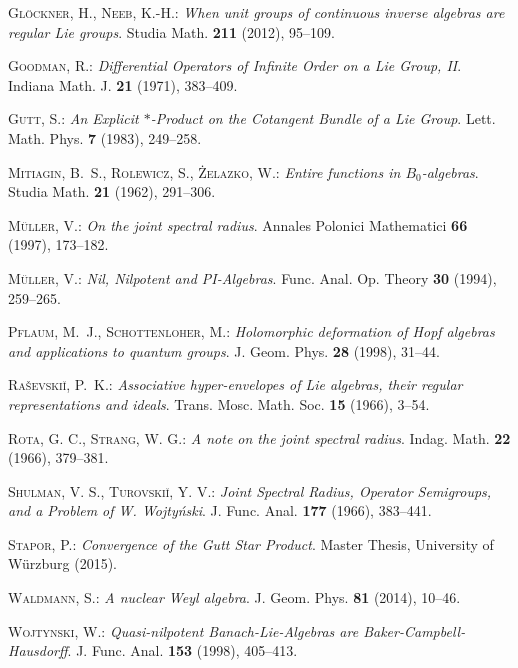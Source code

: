 \documentclass[
11pt,                          %
english                        %
]{article}
\begin{document}
\begin{thebibliography}{1}
\textsc{Gl{\"o}ckner, H., Neeb, K.-H.: }\newblock \emph{When unit groups of
  continuous inverse algebras are regular Lie groups}.
\newblock Studia Math.  \textbf{211} (2012), 95--109.

\textsc{Goodman, R.: }\newblock \emph{Differential Operators of Infinite Order
  on a Lie Group, II}.
\newblock Indiana Math. J.  \textbf{21} (1971), 383--409.

\textsc{Gutt, S.: }\newblock \emph{An Explicit $*$-Product on the Cotangent
  Bundle of a Lie Group}.
\newblock Lett. Math. Phys.  \textbf{7} (1983), 249--258.

\textsc{Mitiagin, B.~S., Rolewicz, S., {\.{Z}}elazko, W.: }\newblock
  \emph{Entire functions in $B_0$-algebras}.
\newblock Studia Math.  \textbf{21} (1962), 291--306.

\textsc{M{\"u}ller, V.: }\newblock \emph{On the joint spectral radius}.
\newblock Annales Polonici Mathematici \textbf{66} (1997), 173--182.

\textsc{M{\"u}ller, V.: }\newblock \emph{Nil, Nilpotent and PI-Algebras}.
\newblock Func. Anal. Op. Theory  \textbf{30} (1994), 259--265.

\textsc{Pflaum, M.~J., Schottenloher, M.: }\newblock \emph{Holomorphic
  deformation of Hopf algebras and applications to quantum groups}.
\newblock J. Geom. Phys.  \textbf{28} (1998), 31--44.

\textsc{Ra{\v{s}}evski{\u{i}}, P.~K.: }\newblock \emph{Associative
  hyper-envelopes of Lie algebras, their regular representations and ideals}.
\newblock Trans. Mosc. Math. Soc.  \textbf{15} (1966), 3--54.

\textsc{Rota, G. C., Strang, W. G.: }\newblock \emph{A note on the joint spectral 
  radius}.
\newblock Indag. Math. \textbf{22} (1966), 379--381.

\textsc{Shulman, V. S., Turovski\u i, Y. V.: }\newblock \emph{Joint Spectral 
  Radius, Operator Semigroups, and a Problem of W. Wojty\'nski}.
\newblock J. Func. Anal. \textbf{177} (1966), 383--441.

\textsc{Stapor, P.: }\newblock \emph{Convergence 
  of the Gutt Star Product}.
\newblock Master Thesis, University of W\"urzburg (2015).

\textsc{Waldmann, S.: }\newblock \emph{A nuclear Weyl algebra}.
\newblock J. Geom. Phys.  \textbf{81} (2014), 10--46.

\textsc{Wojtynski, W.: }\newblock \emph{Quasi-nilpotent 
{B}anach-{L}ie-Algebras are {B}aker-{C}ampbell-{H}ausdorff}.
\newblock J. Func. Anal.  \textbf{153} (1998), 405--413.

\end{thebibliography}



\end{document}
